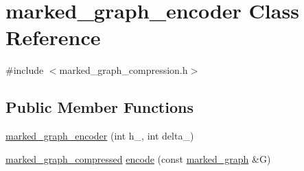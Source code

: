 \hypertarget{classmarked__graph__encoder}{}\section{marked\+\_\+graph\+\_\+encoder Class Reference}
\label{classmarked__graph__encoder}


{\ttfamily \#include $<$marked\+\_\+graph\+\_\+compression.\+h$>$}

\subsection*{Public Member Functions}
\begin{DoxyCompactItemize}
\item 
\hyperlink{classmarked__graph__encoder_a128d2a38b23ce620c77d00a5eff487ea}{marked\+\_\+graph\+\_\+encoder} (int h\+\_\+, int delta\+\_\+)
\item 
\hyperlink{classmarked__graph__compressed}{marked\+\_\+graph\+\_\+compressed} \hyperlink{classmarked__graph__encoder_aa7fa19a225dd9b31d6fef9583fab8cf1}{encode} (const \hyperlink{classmarked__graph}{marked\+\_\+graph} \&G)
\end{DoxyCompactItemize}
